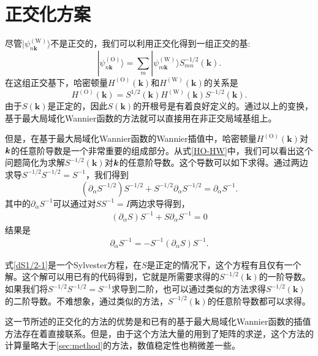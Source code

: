 \section{正交化方案}\label{sec:orthogonalization}

尽管$|\psi^{(\text{W})}_{n\boldsymbol{k}}\rangle$不是正交的，我们可以利用正交化得到一组正交的基:
\begin{equation}
|\psi^{(\text{O})}_{n\boldsymbol{k}}\rangle=
\sum_m |\psi^{(\text{W})}_{m\boldsymbol{k}}\rangle S^{-1/2}_{mn}(\boldsymbol{k}).
\end{equation}
在这组正交基下，哈密顿量$H^{(\text{O})}(\boldsymbol{k})$和$H^{(\text{W})}(\boldsymbol{k})$的关系是
\begin{equation}
H^{(\text{O})}(\boldsymbol{k})=S^{1/2}(\boldsymbol{k})H^{(\text{W})}(\boldsymbol{k})S^{-1/2}(\boldsymbol{k}).\label{HO-HW}
\end{equation}
由于$S(\boldsymbol{k})$是正定的，因此$S(\boldsymbol{k})$的开根号是有着良好定义的。通过以上的变换，基于最大局域化Wannier函数的方法就可以直接用在非正交局域基组上。

但是，在基于最大局域化Wannier函数的Wannier插值中，哈密顿量$H^{(\text{O})}(\boldsymbol{k})$对$\boldsymbol{k}$的任意阶导数是一个非常重要的组成部分。从式\ref{HO-HW}中，我们可以看出这个问题简化为求解$S^{-1/2}(\boldsymbol{k})$对$\boldsymbol{k}$的任意阶导数。这个导数可以如下求得。通过两边求导$S^{-1/2}S^{-1/2}=S^{-1}$，我们得到
\begin{equation}
(\partial_{\alpha}S^{-1/2})S^{-1/2}+S^{-1/2}\partial_{\alpha}S^{-1/2}=\partial_{\alpha}S^{-1}.\label{dS1/2-1}
\end{equation}
其中的$\partial_{\alpha}S^{-1}$可以通过对$SS^{-1}=I$两边求导得到，
\begin{align}
(\partial_{\alpha}S)S^{-1}+S\partial_{\alpha}S^{-1}=0
\end{align}
结果是
\begin{align}
\partial_{\alpha}S^{-1} = -S^{-1}(\partial_{\alpha}S)S^{-1}.
\end{align}

式\ref{dS1/2-1}是一个Sylvester方程\cite{sylvester}，在$S$是正定的情况下，这个方程有且仅有一个解。这个解可以用已有的代码得到\cite{laug}，它就是所需要求得的$S^{-1/2}(\boldsymbol{k})$的一阶导数。如果我们将$S^{-1/2}S^{-1/2}=S^{-1}$求导到二阶，也可以通过类似的方法求得$S^{-1/2}(\boldsymbol{k})$的二阶导数。不难想象，通过类似的方法，$S^{-1/2}(\boldsymbol{k})$的任意阶导数都可以求得。


这一节所述的正交化的方法的优势是和已有的基于最大局域化Wannier函数的插值方法存在着直接联系。但是，由于这个方法大量的用到了矩阵的求逆，这个方法的计算量略大于\ref{sec:method}的方法，数值稳定性也稍微差一些。


